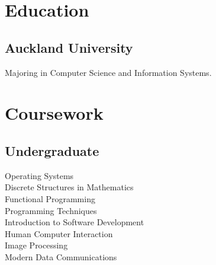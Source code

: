 \documentclass[a4paper]{deedy-resume} %
\begin{document}


\begin{minipage}[t]{0.33\textwidth} %


\section{Education} 

\subsection{Auckland University}

Majoring in Computer Science and Information Systems.


\sectionspace %

\sectionspace %



\section{Coursework}

\subsection{Undergraduate}

Operating Systems \\
Discrete Structures in Mathematics \\
Functional Programming \\
Programming Techniques \\
Introduction to Software Development \\
Human Computer Interaction \\
Image Processing \\
Modern Data Communications \\


\end{minipage}
\end{document}
